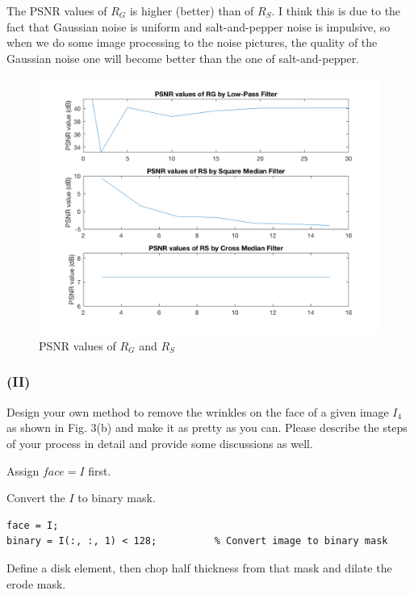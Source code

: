 \documentclass{article}
\begin{document}
\begin{enumerate}[label=(\alph*)]
    The PSNR values of $R_G$ is higher (better) than of $R_S$. I think this is due to the fact that Gaussian noise is uniform and salt-and-pepper noise is impulsive, so when we do some image processing to the noise pictures, the quality of the Gaussian noise one will become better than the one of salt-and-pepper.

    \begin{figure}[!htb]
        \includegraphics[width=\textwidth]{img/plotPSNR.png}
        \caption{PSNR values of $R_G$ and $R_S$}
        \label{PSNR values of $R_G$ and $R_S$}
    \end{figure}

\end{enumerate}

\newpage
\subsubsection*{(II)} Design your own method to remove the wrinkles on the face of a given image $I_4$ as shown in Fig. 3(b) and make it as pretty as you can. Please describe the steps of your process in detail and provide some discussions as well. 

Assign $face = I$ first.

Convert the $I$ to binary mask.

\begin{lstlisting}
face = I;
binary = I(:, :, 1) < 128;          % Convert image to binary mask
\end{lstlisting}

Define a disk element, then chop half thickness from that mask and dilate the erode mask.
\end{document}
